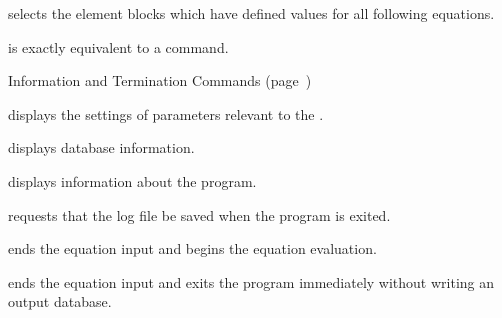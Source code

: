  {
selects the element blocks which have defined values for all following
equations.
}

 {
is exactly equivalent to a \cmd{BLOCKS} command.
}

\newpage %
\bigskip \begin{center}
Information and Termination Commands (page~\pageref{cmd:infoterm})
\end{center}

 {
displays the settings of parameters relevant to the .
}

 {
displays database information.
}

 {
displays information about the \caps{\PROGRAM} program.
}

 {
requests that the log file be saved when the program is exited.
}

 {
ends the equation input and begins the equation evaluation.
}

 {
ends the equation input and exits the program immediately without
writing an output database.
}
